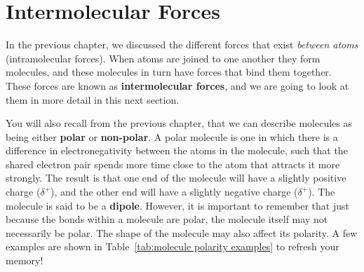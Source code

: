 \chapter{Intermolecular Forces}
\label{chap:intermolecular}
In the previous chapter, we discussed the different forces that exist \textit{between atoms} (intramolecular forces). When atoms are joined to one another they form molecules, and these molecules in turn have forces that bind them together. These forces are known as \textbf{intermolecular forces}, and we are going to look at them in more detail in this next section.\\

You will also recall from the previous chapter, that we can describe molecules as being either \textbf{polar} or \textbf{non-polar}. A polar molecule is one in which there is a difference in electronegativity between the atoms in the molecule, such that the shared electron pair spends more time close to the atom that attracts it more strongly. The result is that one end of the molecule will have a slightly positive charge ($\delta^{+}$), and the other end will have a slightly negative charge ($\delta^{+}$). The molecule is said to be a \textbf{dipole}. However, it is important to remember that just because the bonds within a molecule are polar, the molecule itself may not necessarily be polar. The shape of the molecule may also affect its polarity. A few examples are shown in Table~\ref{tab:molecule polarity examples} to refresh your memory!

